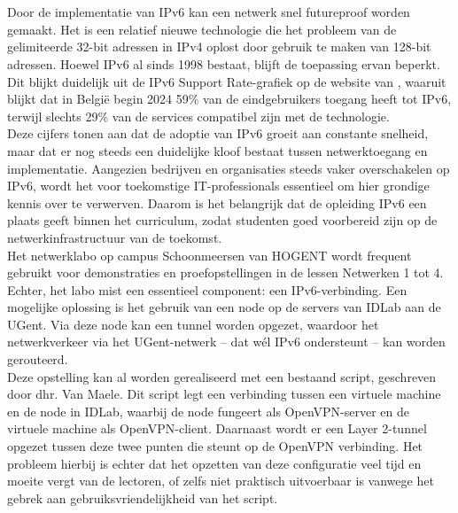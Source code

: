 
\chapter{}%
\label{ch:inleiding}

\section{}%
\label{sec:probleemstelling}

Door de implementatie van IPv6 kan een netwerk snel futureproof worden gemaakt. 
Het is een relatief nieuwe technologie die het probleem van de gelimiteerde 32-bit adressen in IPv4 oplost door gebruik te maken van 128-bit adressen. 
Hoewel IPv6 al sinds 1998 bestaat, blijft de toepassing ervan beperkt. Dit blijkt duidelijk uit de IPv6 Support Rate-grafiek op de website van \textcite{EuropeanCommission}, 
waaruit blijkt dat in België begin 2024 59\% van de eindgebruikers toegang heeft tot IPv6, terwijl slechts 29\% van de services compatibel zijn met de technologie.
\\

Deze cijfers tonen aan dat de adoptie van IPv6 groeit aan constante snelheid, maar dat er nog steeds een duidelijke kloof bestaat tussen netwerktoegang en implementatie. 
Aangezien bedrijven en organisaties steeds vaker overschakelen op IPv6, wordt het voor toekomstige IT-professionals essentieel om hier grondige kennis over te verwerven. 
Daarom is het belangrijk dat de opleiding IPv6 een plaats geeft binnen het curriculum, zodat studenten goed voorbereid zijn op de netwerkinfrastructuur van de toekomst.
\\

Het netwerklabo op campus Schoonmeersen van HOGENT wordt frequent gebruikt voor demonstraties en proefopstellingen in de lessen Netwerken 1 tot 4. 
Echter, het labo mist een essentieel component: een IPv6-verbinding. 
Een mogelijke oplossing is het gebruik van een node op de servers van IDLab aan de UGent. 
Via deze node kan een tunnel worden opgezet, waardoor het netwerkverkeer via het UGent-netwerk – dat wél IPv6 ondersteunt – kan worden gerouteerd.
\\

Deze opstelling kan al worden gerealiseerd met een bestaand script, geschreven door dhr. Van Maele. 
Dit script legt een verbinding tussen een virtuele machine en de node in IDLab, waarbij de node fungeert als OpenVPN-server en de virtuele machine als OpenVPN-client. 
Daarnaast wordt er een Layer 2-tunnel opgezet tussen deze twee punten die steunt op de OpenVPN verbinding.
Het probleem hierbij is echter dat het opzetten van deze configuratie veel tijd en moeite vergt van de lectoren, 
of zelfs niet praktisch uitvoerbaar is vanwege het gebrek aan gebruiksvriendelijkheid van het script.


